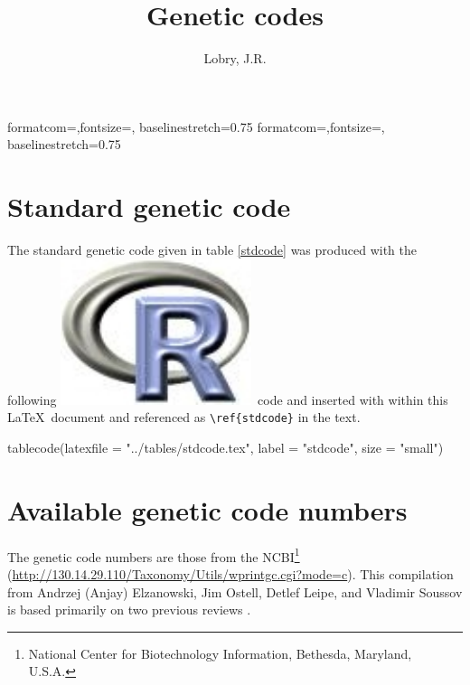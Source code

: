 \documentclass{article}
\title{Genetic codes}
\author{Lobry, J.R.}
\begin{document}
%
%
{formatcom={\color{Sinput}},fontsize=\footnotesize, baselinestretch=0.75}
{formatcom={\color{Soutput}},fontsize=\footnotesize, baselinestretch=0.75}
%
%
\newcommand{\Rlogo}{\protect\includegraphics[height=1.8ex,keepaspectratio]{../figs/Rlogo.pdf}}
%
%
\newcommand{\seqinr}{\texttt{seqin\bf{R}}}
\newcommand{\Seqinr}{\texttt{Seqin\bf{R}}}
%
%
%
%
%


\maketitle

\section{Standard genetic code}

The standard genetic code given in table \ref{stdcode} was produced with the
following \Rlogo{}~code and inserted with \verb||
within this \LaTeX~document and referenced as \verb|\ref{stdcode}| in
the text.

\begin{Schunk}
\begin{Sinput}
 tablecode(latexfile = "../tables/stdcode.tex", label = "stdcode", 
     size = "small")
\end{Sinput}
\end{Schunk}



\section{Available genetic code numbers}

The genetic code numbers are those from the NCBI\footnote{
National Center for Biotechnology Information, Bethesda, Maryland, U.S.A.
} (\url{http://130.14.29.110/Taxonomy/Utils/wprintgc.cgi?mode=c}).
This compilation from Andrzej (Anjay) Elzanowski, Jim Ostell, Detlef Leipe, 
and Vladimir Soussov is based primarily on two previous reviews
\cite{OsawaS1992, JukesTH1993}.
\end{document}
